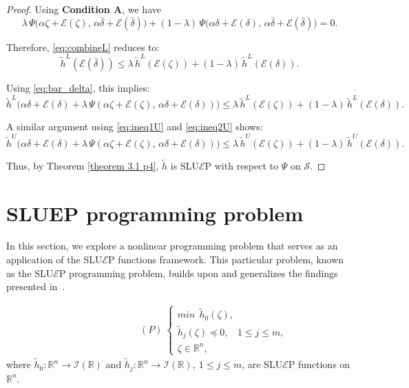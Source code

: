 \documentclass[12pt, reqno]{amsart}
\theoremstyle{definition}
\theoremstyle{remark}
\numberwithin{equation}{section}
\begin{document}
\begin{proof}
    Using \textbf{Condition A}, we have
    \[
    \lambda\, \Psi\big(\alpha \zeta + \mathcal{E}(\zeta),\, \alpha \bar{\delta} + \mathcal{E}(\bar{\delta})\big) 
    + (1-\lambda)\, \Psi\big(\alpha \delta + \mathcal{E}(\delta),\, \alpha \bar{\delta} + \mathcal{E}(\bar{\delta})\big)
    = 0.
    \]

    Therefore, \eqref{eq:combineL} reduces to:
    \[
    \tilde{h}^L(\mathcal{E}(\bar{\delta})) 
    \leq \lambda\, \tilde{h}^L(\mathcal{E}(\zeta)) + (1-\lambda)\, \tilde{h}^L(\mathcal{E}(\delta)).
    \]

    Using \eqref{eq:bar_delta}, this implies:
    \[
    \tilde{h}^L\!\Big(
    \alpha \delta + \mathcal{E}(\delta) 
    + \lambda\, \Psi(\alpha \zeta + \mathcal{E}(\zeta),\, \alpha \delta + \mathcal{E}(\delta))
    \Big) 
    \leq 
    \lambda\, \tilde{h}^L(\mathcal{E}(\zeta)) + (1-\lambda)\, \tilde{h}^L(\mathcal{E}(\delta)).
    \]

    A similar argument using \eqref{eq:ineq1U} and \eqref{eq:ineq2U} shows:
    \[
    \tilde{h}^U\!\Big(
    \alpha \delta + \mathcal{E}(\delta) 
    + \lambda\, \Psi(\alpha \zeta + \mathcal{E}(\zeta),\, \alpha \delta + \mathcal{E}(\delta))
    \Big) 
    \leq 
    \lambda\, \tilde{h}^U(\mathcal{E}(\zeta)) + (1-\lambda)\, \tilde{h}^U(\mathcal{E}(\delta)).
    \]

    Thus, by Theorem \ref{theorem 3.1 p4}, $\tilde{h}$ is SLU$\mathcal{E}$P with respect to ${\Psi}$ on $\mathcal{S}$.
\end{proof}
\section{\textbf{SLUEP programming problem}}
       
       In this section, we explore a nonlinear programming problem that serves as an application of the SLU$\mathcal{E}$P functions framework. This particular problem, known as the SLU$\mathcal{E}$P programming problem, builds upon and generalizes the findings presented in~\cite{Iqbal2022}.

         \begin{eqnarray}\label{4.1}
          \hspace{3cm}(P)~ 
         \left\{\begin{array}{ll}
         	 min ~~\tilde{h}_{0}(\mathit{\zeta} ),\\
         	 
         	 \tilde{h}_{j}(\mathit{\zeta} )\preceq 0,~~~~1\leq j\leq m,\\
         	 
         	\mathit{\zeta} \in  \mathbb{R}^{n},
         \end{array}\right.
           \end{eqnarray}
            where $ \tilde{h}_{0}: \mathbb{R}^{n}\rightarrow  \mathcal{I}(\mathbb{R})$ and $ \tilde{h}_{j}: \mathbb{R}^{n}\rightarrow  \mathcal{I}(\mathbb{R}),~1\leq j\leq m$, are  SLU$\mathcal{E}$P functions on $ \mathbb{R}^{n}$.
        
\end{document}
